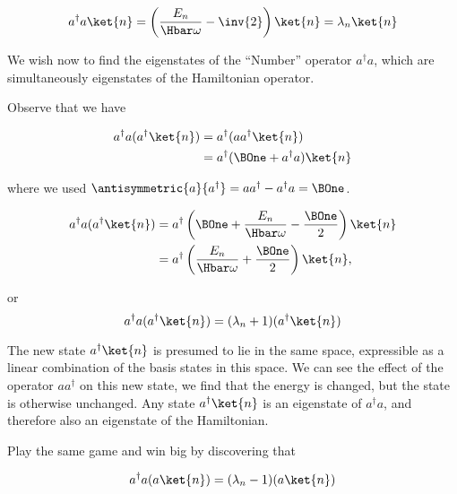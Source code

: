 \begin{equation}\label{eqn:PHY356FLecture11:80}
a^\dagger a \ket{n} = \left( \frac{E_n}{\Hbar \omega} - \inv{2} \right) \ket{n} = \lambda_n \ket{n}
\end{equation}

We wish now to find the eigenstates of the ``Number'' operator \(a^\dagger a\), which are simultaneously eigenstates of the Hamiltonian operator.

Observe that we have

\begin{equation}\label{eqn:lecture11harmonicOscillator:680}
\begin{aligned}
a^\dagger a (a^\dagger \ket{n} )
&= a^\dagger ( a a^\dagger \ket{n} ) \\
&= a^\dagger ( \BOne + a^\dagger a ) \ket{n}
\end{aligned}
\end{equation}

where we used \(\antisymmetric{a}{a^\dagger} = a a^\dagger - a^\dagger a = \BOne\).

\begin{equation}\label{eqn:lecture11harmonicOscillator:700}
\begin{aligned}
a^\dagger a (a^\dagger \ket{n} )
&= a^\dagger \left( \BOne + \frac{E_n}{\Hbar\omega} - \frac{\BOne}{2} \right) \ket{n} \\
&= a^\dagger \left( \frac{E_n}{\Hbar\omega} + \frac{\BOne}{2} \right) \ket{n},
\end{aligned}
\end{equation}

or
\begin{equation}\label{eqn:PHY356FLecture11:100}
a^\dagger a (a^\dagger \ket{n} ) = (\lambda_n + 1) (a^\dagger \ket{n} )
\end{equation}

The new state \(a^\dagger \ket{n}\) is presumed to lie in the same space, expressible as a linear combination of the basis states in this space.  We can see the effect of the operator \(a a^\dagger\) on this new state, we find that the energy is changed, but the state is otherwise unchanged.  Any state \(a^\dagger \ket{n}\) is an eigenstate of \(a^\dagger a\), and therefore also an eigenstate of the Hamiltonian.

Play the same game and win big by discovering that

\begin{equation}\label{eqn:PHY356FLecture11:110}
a^\dagger a ( a \ket{n} ) = (\lambda_n -1) (a \ket{n} )
\end{equation}

